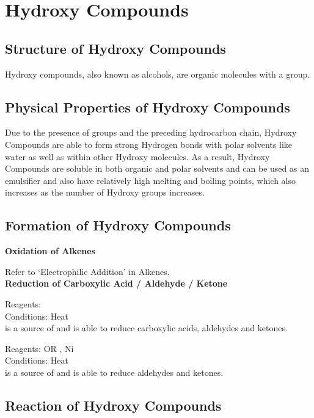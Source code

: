 \documentclass[../main]{subfiles}
\begin{document}
\section{Hydroxy Compounds}

	\subsection{Structure of Hydroxy Compounds}

	Hydroxy compounds, also known as alcohols, are organic molecules with a  group. \\

	\subsection{Physical Properties of Hydroxy Compounds}

	Due to the presence of  groups and the preceding hydrocarbon chain, Hydroxy Compounds are able to form strong Hydrogen bonds with polar solvents like water as well as within other Hydroxy molecules. As a result, Hydroxy Compounds are soluble in both organic and polar solvents and can be used as an emulsifier and also have relatively high melting and boiling points, which also increases as the number of Hydroxy groups increases.

	\subsection{Formation of Hydroxy Compounds}

	\noindent \textbf{Oxidation of Alkenes}

	Refer to `Electrophilic Addition' in Alkenes. \\

	\noindent \textbf{Reduction of Carboxylic Acid / Aldehyde / Ketone}

	Reagents: \\
	Conditions: Heat \\

	 is a source of  and is able to reduce carboxylic acids, aldehydes and ketones. 

	Reagents:  OR , Ni \\
	Conditions: Heat \\

	 is a source of  and is able to reduce aldehydes and ketones. 

	\subsection{Reaction of Hydroxy Compounds}
\end{document}
